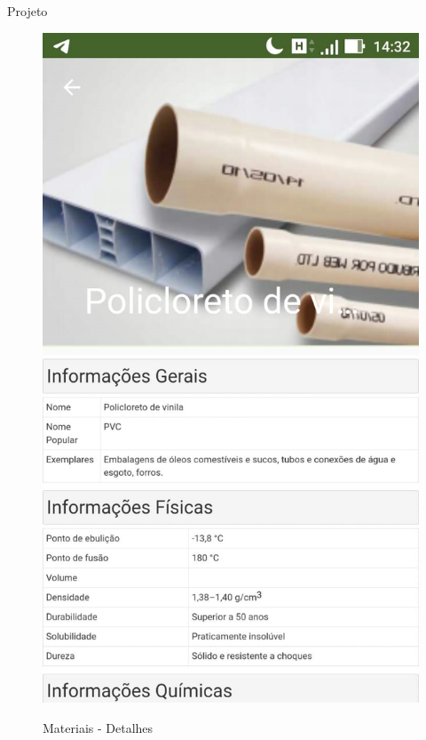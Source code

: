 \documentclass[
	12pt,				%
	openright,			%
	twoside,			%
	a4paper,			%
	english,			%
	french,				%
	spanish,			%
	brazil				%
	]{abntex2}
\begin{document}
\begin{chapter}{Projeto}
    \begin{figure}[htb]    
 \centering
  \begin{minipage}{0.45\textwidth}
    \centering
    \caption{Materiais - Detalhes}
    \includegraphics[scale=0.35]{media/tela_material__details_act_1.jpg}
     \label{fig:tela_material__details_act_1}
  \end{minipage}
  \hfill
  \begin{minipage}{0.45\textwidth}
    \centering

\end{minipage}
\end{figure}
\end{chapter}
\end{document}
